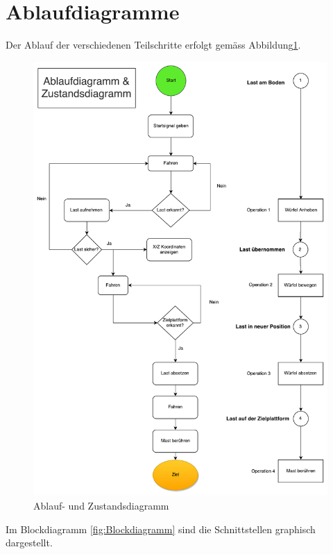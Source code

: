 \documentclass[a4paper]{report}
\begin{document}
\newpage
\section{Ablaufdiagramme}
\label{sec:Ablaufdiagramme}
Der Ablauf der verschiedenen Teilschritte erfolgt gemäss Abbildung\ref{fig:Ablaufdiagramm}.

\begin{figure}[h!]
	\includegraphics[keepaspectratio,width=\textwidth]{Ablaufdiagramm}
	\caption{Ablauf- und Zustandsdiagramm}
	\label{fig:Ablaufdiagramm}
\end{figure}

Im Blockdiagramm \ref{fig:Blockdiagramm} sind die Schnittstellen graphisch dargestellt.
\end{document}
